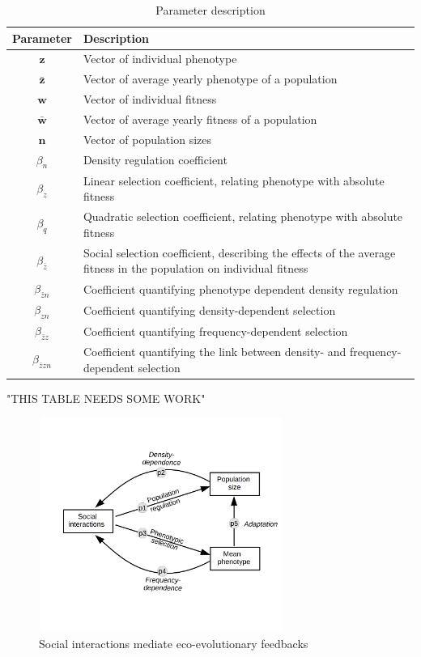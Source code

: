 \documentclass{article}
\begin{document}


  
\newpage
\begin{table}
	\begin{singlespace}
		\begin{tabular}{|c|p{12cm}|} 
			\hline
			
			Parameter & Description \\ 
			\hline
			$\mathbf{z}$        & Vector of individual phenotype \\ 
			$\bar{\mathbf{z}}$  & Vector of average yearly phenotype of a population\\ 
			$\mathbf{w}$        & Vector of individual fitness \\ 
			$\bar{\mathbf{w}}$  & Vector of average yearly fitness of a population\\ 
			$\mathbf{n}$        & Vector of population sizes \\ 
			$\beta_n$              & Density regulation coefficient \\ 
			$\beta_z$              & Linear selection coefficient, relating phenotype with absolute fitness \\ 
			$\beta_q$              & Quadratic selection coefficient, relating phenotype with absolute fitness \\ 
			$\beta_{\bar{z}}$      & Social selection coefficient, describing the effects of the average fitness in the population on individual fitness \\ 
			$\beta_{\bar{z}n}$     & Coefficient quantifying phenotype dependent density regulation \\ 
			$\beta_{zn}$           & Coefficient quantifying density-dependent selection \\ 
			$\beta_{\bar{z}z}$     & Coefficient quantifying frequency-dependent selection \\ 
			$\beta_{\bar{z}zn}$    & Coefficient quantifying the link between density- and frequency-dependent selection\\ 
			\hline
		\end{tabular}
		\caption{Parameter description  }
	\end{singlespace}
\end{table}

"THIS TABLE NEEDS SOME WORK"

  
\begin{figure}[ht]
	\centering
	\includegraphics[width=8cm, height=7cm]{Figures/Fig1.jpg}
	\caption{Social interactions mediate eco-evolutionary feedbacks}
\end{figure}
\end{document}
